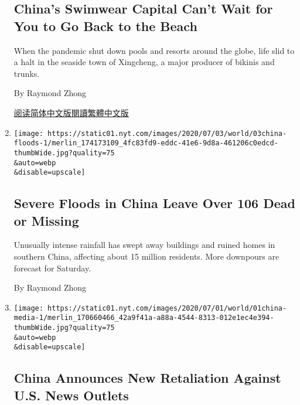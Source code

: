\begin{enumerate}
  \hypertarget{chinas-swimwear-capital-cant-wait-for-you-to-go-back-to-the-beach}{%
  \subsection{China's Swimwear Capital Can't Wait for You to Go Back to
  the
  Beach}\label{chinas-swimwear-capital-cant-wait-for-you-to-go-back-to-the-beach}}

  When the pandemic shut down pools and resorts around the globe, life
  slid to a halt in the seaside town of Xingcheng, a major producer of
  bikinis and trunks.

  By Raymond Zhong

  \href{https://cn.nytimes.com/business/20200720/china-coronavirus-swimsuits/}{阅读简体中文版}\href{https://cn.nytimes.com/business/20200720/china-coronavirus-swimsuits/zh-hant/}{閱讀繁體中文版}
\item
  \href{/2020/07/03/world/asia/china-floods-rain.html}{}

  \texttt{[image: https://static01.nyt.com/images/2020/07/03/world/03china-floods-1/merlin\_174173109\_4fc83fd9-eddc-41e6-9d8a-461206c0edcd-thumbWide.jpg?quality=75\\\&auto=webp\\\&disable=upscale]}

  \hypertarget{severe-floods-in-china-leave-over-106-dead-or-missing}{%
  \subsection{Severe Floods in China Leave Over 106 Dead or
  Missing}\label{severe-floods-in-china-leave-over-106-dead-or-missing}}

  Unusually intense rainfall has swept away buildings and ruined homes
  in southern China, affecting about 15 million residents. More
  downpours are forecast for Saturday.

  By Raymond Zhong
\item
  \href{/2020/07/01/business/media/china-journalists-crackdown.html}{}

  \texttt{[image: https://static01.nyt.com/images/2020/07/01/world/01china-media-1/merlin\_170660466\_42a9f41a-a88a-4544-8313-012e1ec4e394-thumbWide.jpg?quality=75\\\&auto=webp\\\&disable=upscale]}

  \hypertarget{china-announces-new-retaliation-against-us-news-outlets}{%
  \subsection{China Announces New Retaliation Against U.S. News
  Outlets}\label{china-announces-new-retaliation-against-us-news-outlets}}


\end{enumerate}
